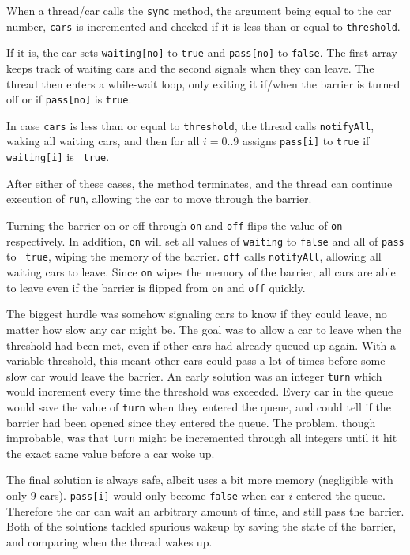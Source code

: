 When a thread/car calls the \texttt{sync} method, the argument being equal to the car number, \texttt{cars} is incremented and checked if it is less than or equal to \texttt{threshold}.

If it is, the car sets \texttt{waiting[no]} to \texttt{true} and \texttt{pass[no]} to \texttt{false}. The first array keeps track of waiting cars and the second signals when they can leave. The thread then enters a while-wait loop, only exiting it if/when the barrier is turned off or if \texttt{pass[no]} is \texttt{true}.

In case \texttt{cars} is less than or equal to \texttt{threshold}, the thread calls \texttt{notifyAll}, waking all waiting cars, and then for all $i=0..9$ assigns \texttt{pass[i]} to \texttt{true} if \texttt{waiting[i]} is \texttt{ true}.

After either of these cases, the method terminates, and the thread can continue execution of \texttt{run}, allowing the car to move through the barrier.

Turning the barrier on or off through \texttt{on} and \texttt{off} flips the value of \texttt{on} respectively. In addition, \texttt{on} will set all values of \texttt{waiting} to \texttt{false} and all of \texttt{pass} to \texttt{ true}, wiping the memory of the barrier. \texttt{off} calls \texttt{notifyAll}, allowing all waiting cars to leave. Since \texttt{on} wipes the memory of the barrier, all cars are able to leave even if the barrier is flipped from \texttt{on} and \texttt{off} quickly.

The biggest hurdle was somehow signaling cars to know if they could leave, no matter how slow any car might be. The goal was to allow a car to leave when the threshold had been met, even if other cars had already queued up again. With a variable threshold, this meant other cars could pass a lot of times before some slow car would leave the barrier. An early solution was an integer \texttt{turn} which would increment every time the threshold was exceeded. Every car in the queue would save the value of \texttt{turn} when they entered the queue, and could tell if the barrier had been opened since they entered the queue. The problem, though improbable, was that \texttt{turn} might be incremented through all integers until it hit the exact same value before a car woke up.

The final solution is always safe, albeit uses a bit more memory (negligible with only $9$ cars). \texttt{pass[i]} would only become \texttt{false} when car $i$ entered the queue. Therefore the car can wait an arbitrary amount of time, and still pass the barrier. Both of the solutions tackled spurious wakeup by saving the state of the barrier, and comparing when the thread wakes up.

